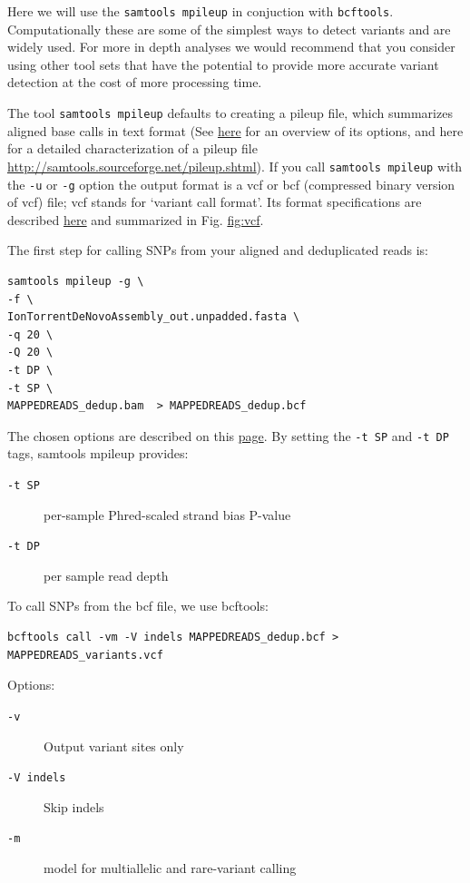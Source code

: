 \documentclass[11pt]{article}
\begin{document}
Here we will use the \texttt{samtools mpileup} in conjuction with 
\texttt{bcftools}. Computationally these are some of the simplest ways to detect variants
and are widely used. For more in depth analyses we would recommend that you
consider using other tool sets that have the potential to provide more
accurate variant detection at the cost of more processing time.

The tool \texttt{samtools mpileup} defaults to creating a pileup file, which summarizes aligned
base calls in text format (See \href{http://samtools.sourceforge.net/samtools.shtml}{here} for an overview of its options, and here for a detailed characterization of
a pileup file \href{http://samtools.sourceforge.net/pileup.shtml}{http://samtools.sourceforge.net/pileup.shtml}). If you
call \texttt{samtools mpileup} with the \texttt{-u} or \texttt{-g} option the
output format is a vcf or bcf (compressed binary version of vcf) file;
vcf stands for `variant call format'. Its format specifications are
described \href{https://samtools.github.io/hts-specs/VCFv4.2.pdf}{here} and summarized in Fig. \hyperref[fig-vcf]{fig:vcf}.

The first step for calling SNPs from your aligned and deduplicated
reads is:


\begin{verbatim}
samtools mpileup -g \
-f \
IonTorrentDeNovoAssembly_out.unpadded.fasta \
-q 20 \
-Q 20 \
-t DP \
-t SP \
MAPPEDREADS_dedup.bam  > MAPPEDREADS_dedup.bcf
\end{verbatim}

The chosen options are described on this \href{http://samtools.sourceforge.net/samtools.shtml}{page}. By setting the \texttt{-t SP} and
\texttt{-t DP} tags, samtools mpileup provides:

\begin{description}
\item[\texttt{-t SP}] per-sample Phred-scaled strand bias P-value
\item[\texttt{-t DP}] per sample read depth
\end{description}


To call SNPs from the bcf file, we use bcftools:


\begin{verbatim}
bcftools call -vm -V indels MAPPEDREADS_dedup.bcf >  MAPPEDREADS_variants.vcf
\end{verbatim}


Options:
\begin{description}
\item[\texttt{-v}] Output variant sites only
\item[\texttt{-V indels}] Skip indels
\item[\texttt{-m}] model for multiallelic and rare-variant calling
\end{description}
\end{document}
